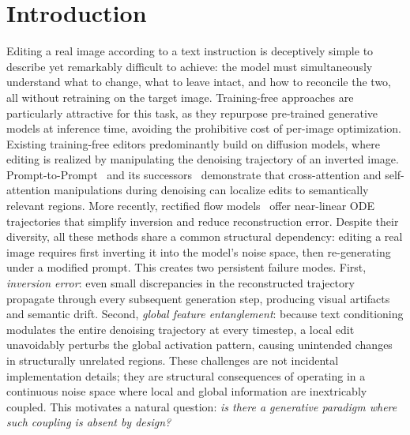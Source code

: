 \section{Introduction}

Editing a real image according to a text instruction is deceptively simple to describe yet remarkably difficult to achieve: the model must simultaneously understand what to change, what to leave intact, and how to reconcile the two, all without retraining on the target image. Training-free approaches are particularly attractive for this task, as they repurpose pre-trained generative models at inference time, avoiding the prohibitive cost of per-image optimization.
Existing training-free editors predominantly build on diffusion models, where editing is realized by manipulating the denoising trajectory of an inverted image. Prompt-to-Prompt~\cite{prompt2prompt} and its successors~\cite{Null-text,PnP,PnP_Inversion,masactrl,pix2pix-zero,LEDits++} demonstrate that cross-attention and self-attention manipulations during denoising can localize edits to semantically relevant regions. More recently, rectified flow models~\cite{Flowedit,RF-inversion,ReFlex,FireFlow} offer near-linear ODE trajectories that simplify inversion and reduce reconstruction error. Despite their diversity, all these methods share a common structural dependency: editing a real image requires first inverting it into the model's noise space, then re-generating under a modified prompt. This creates two persistent failure modes. First, \textit{inversion error}: even small discrepancies in the reconstructed trajectory propagate through every subsequent generation step, producing visual artifacts and semantic drift. Second, \textit{global feature entanglement}: because text conditioning modulates the entire denoising trajectory at every timestep, a local edit unavoidably perturbs the global activation pattern, causing unintended changes in structurally unrelated regions.
These challenges are not incidental implementation details; they are structural consequences of operating in a continuous noise space where local and global information are inextricably coupled. This motivates a natural question: \textit{is there a generative paradigm where such coupling is absent by design?}
